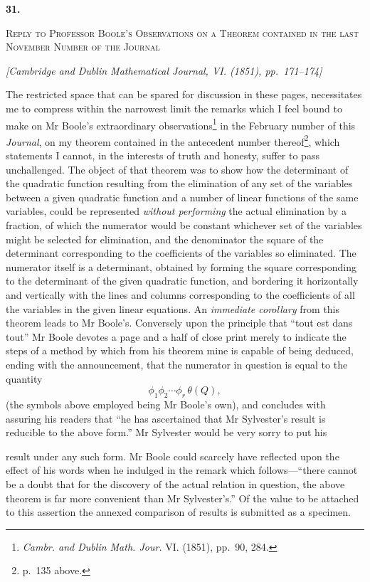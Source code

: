 \documentclass[11pt]{article}
\newcommand{\paperhead}[3]{%
  \clearpage
  \begin{center}
  {\Large\bfseries #1.}\par\vspace{0.85em}
  {\large\scshape #2}\par\vspace{0.6em}
  {\itshape [#3]}\par
  \end{center}\vspace{0.4em}}
\newcommand{\sourcepage}[1]{\marginpar{\scriptsize p.~#1}}
\begin{document}
{{\paperhead{31}{Reply to Professor Boole's Observations on a Theorem contained in the last November Number of the Journal}{Cambridge and Dublin Mathematical Journal, VI. (1851), pp.~171--174}

\sourcepage{181}
The restricted space that can be spared for discussion in these pages, necessitates me to compress within the narrowest limit the remarks which I feel bound to make on Mr Boole's extraordinary observations\footnote{\emph{Cambr. and Dublin Math. Jour.} VI. (1851), pp.~90, 284.} in the February number of this \emph{Journal}, on my theorem contained in the antecedent number thereof\footnote{p.~135 above.}, which statements I cannot, in the interests of truth and honesty, suffer to pass unchallenged. The object of that theorem was to show how the determinant of the quadratic function resulting from the elimination of any set of the variables between a given quadratic function and a number of linear functions of the same variables, could be represented \emph{without performing} the actual elimination by a fraction, of which the numerator would be constant whichever set of the variables might be selected for elimination, and the denominator the square of the determinant corresponding to the coefficients of the variables so eliminated. The numerator itself is a determinant, obtained by forming the square corresponding to the determinant of the given quadratic function, and bordering it horizontally and vertically with the lines and columns corresponding to the coefficients of all the variables in the given linear equations. An \emph{immediate corollary} from this theorem leads to Mr Boole's. Conversely upon the principle that ``tout est dans tout'' Mr Boole devotes a page and a half of close print merely to indicate the steps of a method by which from his theorem mine is capable of being deduced, ending with the announcement, that the numerator in question is equal to the quantity
\[
 \phi_1\phi_2\cdots\phi_r\,\theta(Q),
\]
(the symbols above employed being Mr Boole's own), and concludes with assuring his readers that ``he has ascertained that Mr Sylvester's result is reducible to the above form.'' Mr Sylvester would be very sorry to put his

\sourcepage{182}
result under any such form. Mr Boole could scarcely have reflected upon the effect of his words when he indulged in the remark which follows---``there cannot be a doubt that for the discovery of the actual relation in question, the above theorem is far more convenient than Mr Sylvester's.'' Of the value to be attached to this assertion the annexed comparison of results is submitted as a specimen.

}}
\end{document}

